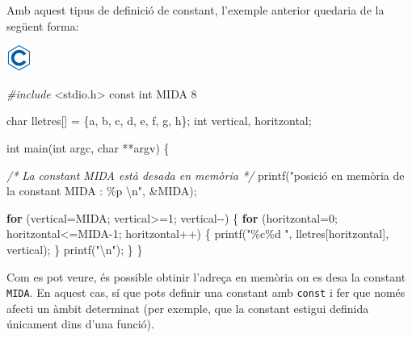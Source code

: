 \documentclass[]{book}
\newenvironment{Shaded}{\begin{snugshade}}{\end{snugshade}}
\newcommand{\CharTok}[1]{\textcolor[rgb]{0.31,0.60,0.02}{#1}}
\newcommand{\CommentTok}[1]{\textcolor[rgb]{0.56,0.35,0.01}{\textit{#1}}}
\newcommand{\ControlFlowTok}[1]{\textcolor[rgb]{0.13,0.29,0.53}{\textbf{#1}}}
\newcommand{\DataTypeTok}[1]{\textcolor[rgb]{0.13,0.29,0.53}{#1}}
\newcommand{\DecValTok}[1]{\textcolor[rgb]{0.00,0.00,0.81}{#1}}
\newcommand{\ImportTok}[1]{#1}
\newcommand{\NormalTok}[1]{#1}
\newcommand{\PreprocessorTok}[1]{\textcolor[rgb]{0.56,0.35,0.01}{\textit{#1}}}
\newcommand{\SpecialCharTok}[1]{\textcolor[rgb]{0.00,0.00,0.00}{#1}}
\newcommand{\StringTok}[1]{\textcolor[rgb]{0.31,0.60,0.02}{#1}}
\begin{document}
Amb aquest tipus de definició de constant, l'exemple anterior quedaria de la següent forma:

\includegraphics{./img/c.png}

\begin{Shaded}
\begin{Highlighting}[]
\PreprocessorTok{\#include }\ImportTok{\textless{}stdio.h\textgreater{}}
\DataTypeTok{const} \DataTypeTok{int}\NormalTok{ MIDA }\DecValTok{8}

\DataTypeTok{char}\NormalTok{ lletres[] = \{}\CharTok{\textquotesingle{}a\textquotesingle{}}\NormalTok{, }\CharTok{\textquotesingle{}b\textquotesingle{}}\NormalTok{, }\CharTok{\textquotesingle{}c\textquotesingle{}}\NormalTok{, }\CharTok{\textquotesingle{}d\textquotesingle{}}\NormalTok{, }\CharTok{\textquotesingle{}e\textquotesingle{}}\NormalTok{, }\CharTok{\textquotesingle{}f\textquotesingle{}}\NormalTok{, }\CharTok{\textquotesingle{}g\textquotesingle{}}\NormalTok{, }\CharTok{\textquotesingle{}h\textquotesingle{}}\NormalTok{\};}
\DataTypeTok{int}\NormalTok{ vertical, horitzontal;}

\DataTypeTok{int}\NormalTok{ main(}\DataTypeTok{int}\NormalTok{ argc, }\DataTypeTok{char}\NormalTok{ **argv) \{}

    \CommentTok{/* La constant MIDA està desada en memòria */}
\NormalTok{    printf(}\StringTok{"posició en memòria de la constant MIDA : \%p }\SpecialCharTok{\textbackslash{}n}\StringTok{"}\NormalTok{, \&MIDA);}

    \ControlFlowTok{for}\NormalTok{ (vertical=MIDA; vertical\textgreater{}=}\DecValTok{1}\NormalTok{; vertical{-}{-}) \{}
        \ControlFlowTok{for}\NormalTok{ (horitzontal=}\DecValTok{0}\NormalTok{; horitzontal\textless{}=MIDA{-}}\DecValTok{1}\NormalTok{; horitzontal++) \{}
\NormalTok{            printf(}\StringTok{"\%c\%d "}\NormalTok{, lletres[horitzontal], vertical);}
\NormalTok{        \}}
\NormalTok{        printf(}\StringTok{"}\SpecialCharTok{\textbackslash{}n}\StringTok{"}\NormalTok{);}
\NormalTok{    \}}
\NormalTok{\}}
\end{Highlighting}
\end{Shaded}

Com es pot veure, és possible obtinir l'adreça en memòria on es desa la constant \texttt{MIDA}. En aquest cas, sí que pots definir una constant amb \texttt{const} i fer que només afecti un àmbit determinat (per exemple, que la constant estigui definida únicament dins d'una funció).
\end{document}
